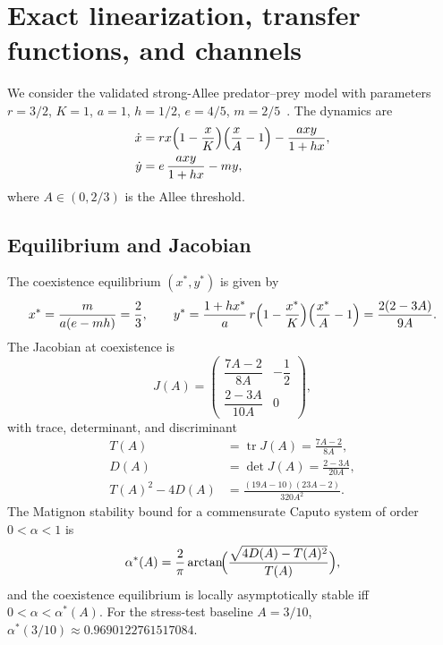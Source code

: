 \section{Exact linearization, transfer functions, and channels}

We consider the validated strong-Allee predator--prey model with parameters
\(r=3/2\), \(K=1\), \(a=1\), \(h=1/2\), \(e=4/5\), \(m=2/5\)~\cite[Sec.~4]{source_pack/04_EXACT_STRONG_ALLEE_BASELINE.md}.
The dynamics are
\begin{align}
\dot x &= r x\Bigl(1-\frac{x}{K}\Bigr)\Bigl(\frac{x}{A}-1\Bigr)-\frac{a x y}{1+h x},\\
\dot y &= e\,\frac{a x y}{1+h x}-m y,
\end{align}
where \(A\in(0,2/3)\) is the Allee threshold.

\subsection{Equilibrium and Jacobian}
The coexistence equilibrium \((x^*,y^*)\) is given by
\begin{equation}
\label{eq:coex}
x^*=\frac{m}{a(e-mh)}=\frac23,\qquad
y^*=\frac{1+hx^*}{a}\,r\Bigl(1-\frac{x^*}{K}\Bigr)\Bigl(\frac{x^*}{A}-1\Bigr)
      =\frac{2(2-3A)}{9A}.
\end{equation}
The Jacobian at coexistence is
\begin{equation}
\label{eq:jac}
J(A)=\begin{pmatrix}
\dfrac{7A-2}{8A} & -\dfrac12 \\[1ex]
\dfrac{2-3A}{10A} & 0
\end{pmatrix},
\end{equation}
with trace, determinant, and discriminant
\begin{align}
T(A)&=\operatorname{tr}J(A)=\frac{7A-2}{8A},\label{eq:trace}\\
D(A)&=\det J(A)=\frac{2-3A}{20A},\label{eq:det}\\
T(A)^2-4D(A)&=\frac{(19A-10)(23A-2)}{320A^2}.\label{eq:disc}
\end{align}
The Matignon stability bound for a commensurate Caputo system of order
\(0<\alpha<1\) is
\begin{equation}
\label{eq:alpha}
\alpha^*(A)=\frac{2}{\pi}\arctan\!\Bigl(
\frac{\sqrt{4D(A)-T(A)^2}}{T(A)}\Bigr),
\end{equation}
and the coexistence equilibrium is locally asymptotically stable iff
\(0<\alpha<\alpha^*(A)\).  For the stress-test baseline \(A=3/10\),
\(\alpha^*(3/10)\approx0.9690122761517084\).


